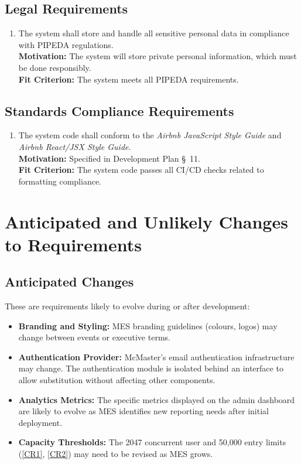 \documentclass[12pt]{article}
\begin{document}
\subsection{Legal Requirements}
\begin{enumerate}[align=left,
  leftmargin=*,
  labelsep=1em,
  itemindent=0em,
  label=\bfseries LG-\arabic*:,
  ref=\bfseries LG-\arabic*]
  \item \label{CLR1} The system shall store and handle all sensitive personal data in compliance with PIPEDA regulations.\\[2mm]
    {\bf Motivation:} The system will store private personal information, which must be done responsibly.\\
    {\bf Fit Criterion:} The system meets all PIPEDA requirements.\\
\end{enumerate}
\subsection{Standards Compliance Requirements}
\begin{enumerate}[align=left,
  leftmargin=*,
  labelsep=1em,
  itemindent=0em,
  label=\bfseries ST-\arabic*:,
  ref=\bfseries ST-\arabic*]
  \item \label{CSCR1} The system code shall conform to the \textit{Airbnb JavaScript Style Guide} and \textit{Airbnb React/JSX
    Style Guide}.\\[2mm]
    {\bf Motivation:} Specified in Development Plan \S \ 11.\\
    {\bf Fit Criterion:} The system code passes all CI/CD checks related to formatting compliance.\\
\end{enumerate}

\section{Anticipated and Unlikely Changes to Requirements}

\subsection{Anticipated Changes}
These are requirements likely to evolve during or after development:
\begin{itemize}
  \item \textbf{Branding and Styling:} MES branding guidelines (colours, logos) may 
    change between events or executive terms. 
  \item \textbf{Authentication Provider:} McMaster's email authentication infrastructure 
    may change. The authentication module is isolated behind an interface to allow 
    substitution without affecting other components.
  \item \textbf{Analytics Metrics:} The specific metrics displayed on the admin dashboard 
    are likely to evolve as MES identifies new reporting needs after initial deployment.
  \item \textbf{Capacity Thresholds:} The 2047 concurrent user and 50,000 entry limits 
    (\ref{CR1}, \ref{CR2}) may need to be revised as MES grows.
\end{itemize}
\end{document}
